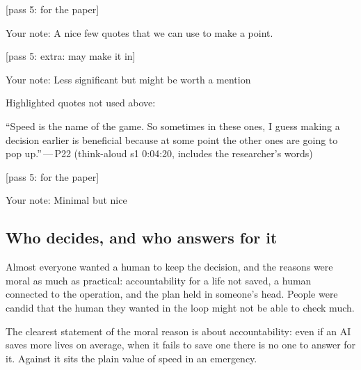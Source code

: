 \begin{options}

 {\footnotesize [pass 5: for the paper]}

\noindent Your note: A nice few quotes that we can use to make a point.

 {\footnotesize [pass 5: extra: may make it in]}

\noindent Your note: Less significant but might be worth a mention

\noindent Highlighted quotes not used above:\begin{quotelist}
\item ``Speed is the name of the game. So sometimes in these ones, I guess making a decision earlier is beneficial because at some point the other ones are going to pop up.''\,---\,P22 (think-aloud s1 0:04:20, includes the researcher's words)
\end{quotelist}

 {\footnotesize [pass 5: for the paper]}

\noindent Your note: Minimal but nice
\end{options}

\clearpage



\subsection{Who decides, and who answers for it}\label{sec:qual:who-decides}

Almost everyone wanted a human to keep the decision, and the reasons were moral as much as practical: accountability for a life not saved, a human connected to the operation, and the plan held in someone's head. People were candid that the human they wanted in the loop might not be able to check much.


\label{sec:qual:who-decides:accountability}
The clearest statement of the moral reason is about accountability: even if an AI saves more lives on average, when it fails to save one there is no one to answer for it. Against it sits the plain value of speed in an emergency.

